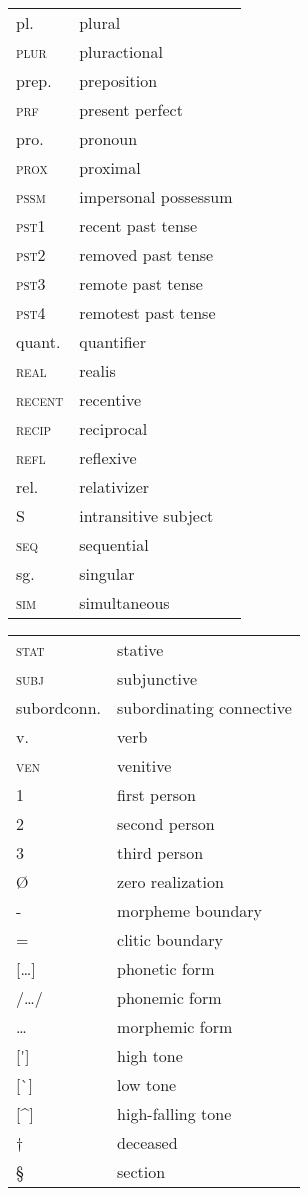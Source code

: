\begin{tabularx}{.48\textwidth}{lQ} 
pl.					&	 plural \\
\textsc{plur}		&	 pluractional \\
prep.				&	 {preposition} \\
\textsc{prf}		&	 present perfect \\
pro.				&	 pronoun \\
\textsc{prox}		&	 proximal \\
\textsc{pssm}		&	 impersonal possessum \\ 
\textsc{pst1}		&	 recent past {tense} \\
\textsc{pst2}		&	 removed past {tense} \\
\textsc{pst3}		&	 remote past {tense} \\
\textsc{pst4}		&	 remotest past {tense} \\
quant.				&	 {quantifier} \\
\textsc{real}		&	 realis \\
\textsc{recent}		&	 recentive \\
\textsc{recip}		&	 {reciprocal} \\
\textsc{refl}		&	 {reflexive} \\
rel.				&	 relativizer \\
S					&	 {intransitive} subject \\
\textsc{seq}		&	 sequential \\
sg.					&	 singular \\
\textsc{sim}		&	 simultaneous \\
\end{tabularx}
\begin{tabularx}{.45\textwidth}{lQ} 
\textsc{stat}		&	 stative \\
\textsc{subj}		&	 subjunctive \\
subordconn.			&	 subordinating connective \\
v.					&	 verb \\
\textsc{ven}		&	 venitive \\
1					&	 first person \\
2					&	 second person \\
3					&	 third person \\
Ø					&	 zero realization \\
-					&	 morpheme boundary \\
=					&	 {clitic} boundary \\{}
[{\dots}]			&	 phonetic form\\{}
/{\dots}/			&	 phonemic form\\{}
{{\dots}}			&	 morphemic form\\{}
[\'{}]				&	 high tone \\{}
[\`{}]				&	 low tone \\{}
[\^{}]				&	 high-falling tone \\
†					&	 deceased \\
§					&	 section \\ 
\end{tabularx}

  